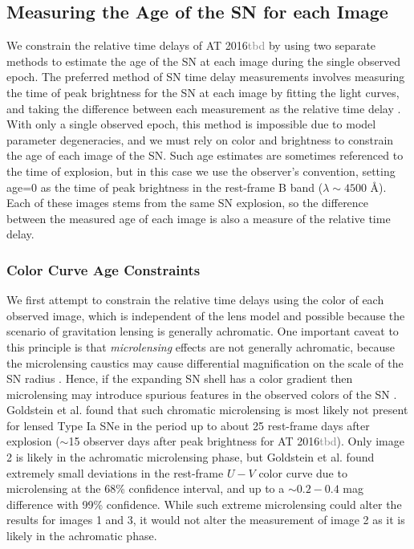 \documentclass[12pt,dvipsnames]{article}
\def\SNABC{AT 2016{\textcolor{Gray}{tbd}}\xspace}
\begin{document}
\subsection*{Measuring the Age of the SN for each Image}
We constrain the relative time delays of \SNABC by using two separate methods to estimate the age of the SN at each image during the single observed epoch. The preferred method of SN time delay measurements involves measuring the time of peak brightness for the SN at each image by fitting the light curves, and taking the difference between each measurement as the relative time delay \cite{pierel_turning_2019,dhawan_magnification_2019,huber_strongly_2019}. With only a single observed epoch, this method is impossible due to model parameter degeneracies, and we must rely on color and brightness to constrain the age of each image of the SN. Such age estimates are sometimes referenced to the time of explosion, but in this case we use the observer's convention, setting age=0 as the time of peak brightness in the rest-frame B band ($\lambda\sim4500$ \AA).  Each of these images stems from the same SN explosion, so the difference between the measured age of each image is also a measure of the relative time delay. 

\subsubsection*{Color Curve Age Constraints}

We first attempt to constrain the relative time delays using the color of each observed image, which is independent of the lens model and possible because the scenario of gravitation lensing is generally achromatic. One important caveat to this principle is that {\it microlensing} effects are not generally achromatic, because the microlensing caustics may cause differential magnification on the scale of the SN radius \cite{goldstein_precise_2018,foxley-marrable_impact_2018,bonvin_impact_2019}.  Hence, if the expanding SN shell has a color gradient then microlensing may introduce spurious features in the observed colors of the SN \cite{kochanek_quantitative_2004,vernardos_joint_2018}.   Goldstein et al. \cite{goldstein_precise_2018} found that such chromatic microlensing is most likely not present for lensed Type Ia SNe in the period up to about 25 rest-frame days after explosion ($\sim$15 observer days after peak brightness for \SNABC). Only image 2 is likely in the achromatic microlensing phase, but Goldstein et al. \cite{goldstein_precise_2018} found extremely small deviations in the rest-frame $U-V$ color curve due to microlensing at the 68\% confidence interval, and up to a $\sim0.2-0.4$ mag difference with 99\% confidence. While such extreme microlensing could alter the results for images 1 and 3, it would not alter the measurement of image 2 as it is likely in the achromatic phase.
\end{document}
